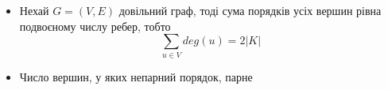 \begin{itemize}
        \item Нехай $G=(V,E)$ довільний граф, тоді сума порядків усіх вершин рівна подвоєному числу ребер, тобто $$\sum_{u \in V} deg(u)=2\vert K \vert$$
        \item Число вершин, у яких непарний порядок, парне
\end{itemize}

